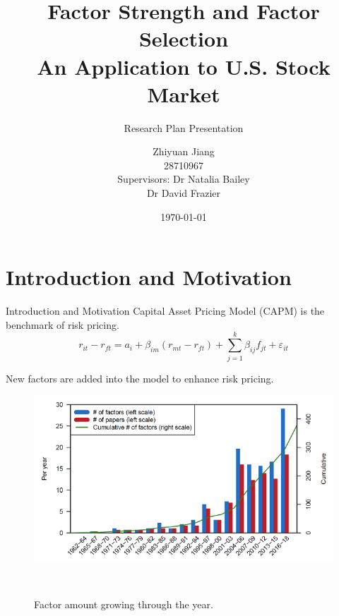 \documentclass[12pt]{beamer}
\title{Factor Strength and Factor Selection\\
		\large
An Application to U.S. Stock Market }
\subtitle{Research Plan Presentation}
\date{\today}
\author[author]{Zhiyuan Jiang\\
			28710967\\[10mm]{\small Supervisors: Dr Natalia Bailey \\ \hspace{18.5mm} Dr David Frazier}}
\begin{document}
	
\frame[plain]{\titlepage}

\section{Introduction and Motivation}
\begin{frame}{Introduction and Motivation}
Capital Asset Pricing Model (CAPM) is the benchmark of risk pricing.
\[r_{it} - r_{ft} = a_i + \beta_{im}(r_{mt} - r_{ft}) + \sum_{j=1}^{k}\beta_{ij}f_{jt} + \varepsilon_{it} \]

New factors are added into the model to enhance risk pricing.
\end{frame}




\begin{frame}[plain]
	\begin{figure}
\includegraphics[scale = 0.5]{figure/factor_growth.png}
\caption{Factor amount growing through the year. }
	\cite{Harvey2017}\\
	\end{figure}
\end{frame}
\end{document}
